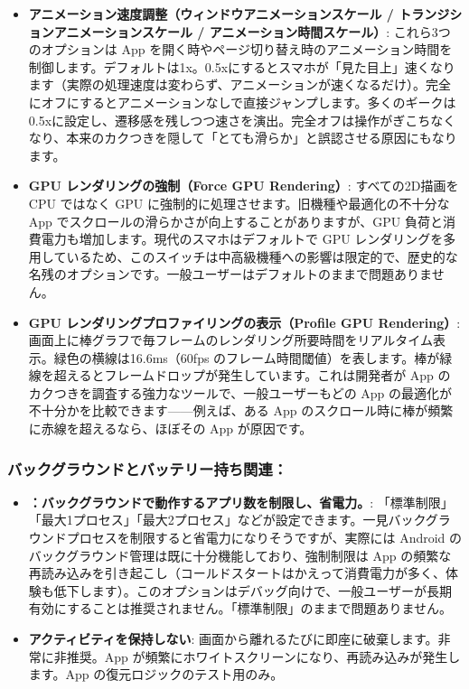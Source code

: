\begin{itemize}
  \item \textbf{アニメーション速度調整（ウィンドウアニメーションスケール / トランジションアニメーションスケール / アニメーション時間スケール）}: これら3つのオプションは App を開く時やページ切り替え時のアニメーション時間を制御します。デフォルトは1x。0.5xにするとスマホが「見た目上」速くなります（実際の処理速度は変わらず、アニメーションが速くなるだけ）。完全にオフにするとアニメーションなしで直接ジャンプします。多くのギークは0.5xに設定し、遷移感を残しつつ速さを演出。完全オフは操作がぎこちなくなり、本来のカクつきを隠して「とても滑らか」と誤認させる原因にもなります。
  \item \textbf{GPU レンダリングの強制（Force GPU Rendering）}: すべての2D描画を CPU ではなく GPU に強制的に処理させます。旧機種や最適化の不十分な App でスクロールの滑らかさが向上することがありますが、GPU 負荷と消費電力も増加します。現代のスマホはデフォルトで GPU レンダリングを多用しているため、このスイッチは中高級機種への影響は限定的で、歴史的な名残のオプションです。一般ユーザーはデフォルトのままで問題ありません。
  \item \textbf{GPU レンダリングプロファイリングの表示（Profile GPU Rendering）}: 画面上に棒グラフで毎フレームのレンダリング所要時間をリアルタイム表示。緑色の横線は16.6ms（60fps のフレーム時間閾値）を表します。棒が緑線を超えるとフレームドロップが発生しています。これは開発者が App のカクつきを調査する強力なツールで、一般ユーザーもどの App の最適化が不十分かを比較できます——例えば、ある App のスクロール時に棒が頻繁に赤線を超えるなら、ほぼその App が原因です。
\end{itemize}

\subsubsection*{バックグラウンドとバッテリー持ち関連：}

\begin{itemize}
  \item \textbf{：バックグラウンドで動作するアプリ数を制限し、省電力。}: 「標準制限」「最大1プロセス」「最大2プロセス」などが設定できます。一見バックグラウンドプロセスを制限すると省電力になりそうですが、実際には Android のバックグラウンド管理は既に十分機能しており、強制制限は App の頻繁な再読み込みを引き起こし（コールドスタートはかえって消費電力が多く、体験も低下します）。このオプションはデバッグ向けで、一般ユーザーが長期有効にすることは推奨されません。「標準制限」のままで問題ありません。
  \item \textbf{アクティビティを保持しない}: 画面から離れるたびに即座に破棄します。非常に非推奨。App が頻繁にホワイトスクリーンになり、再読み込みが発生します。App の復元ロジックのテスト用のみ。
\end{itemize}

